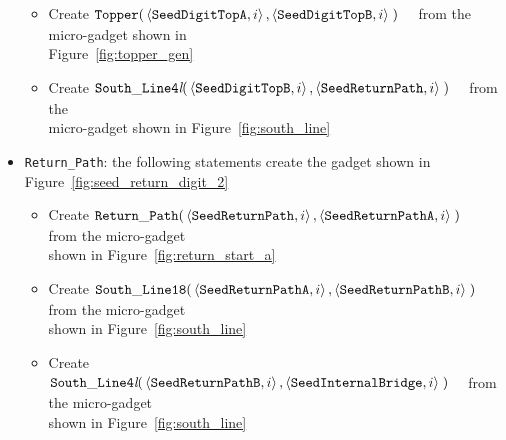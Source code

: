 \begin{itemize}
\begin{itemize}
        \item Create
        $\begin{aligned}[t]
            {\tt Topper}(& \left \langle {\tt SeedDigitTopA}, i \right\rangle,
                           \left \langle {\tt SeedDigitTopB}, i \right\rangle \;)
        \end{aligned}$ from the micro-gadget shown in\\ Figure~\ref{fig:topper_gen}

        \item Create
        $\begin{aligned}[t]
            {\tt South\_Line4\textit{l}}(& \left \langle {\tt SeedDigitTopB}, i \right\rangle,
                                           \left \langle {\tt SeedReturnPath},  i \right\rangle \;)
        \end{aligned}$ from the\\micro-gadget shown in Figure~\ref{fig:south_line}
    \end{itemize}


    \item {\tt Return\_Path}: the following statements create the gadget shown in Figure~\ref{fig:seed_return_digit_2}
    \begin{itemize}

        \item Create
        $\begin{aligned}[t]
            {\tt Return\_Path}(&\left\langle {\tt SeedReturnPath},  i \right\rangle,
                                \left\langle {\tt SeedReturnPathA}, i \right\rangle \;)
        \end{aligned}$ from the micro-gadget\\shown in Figure~\ref{fig:return_start_a}

        \item Create
        $\begin{aligned}[t]
            {\tt South\_Line18}(&\left\langle {\tt SeedReturnPathA}, i \right\rangle,
                                 \left\langle {\tt SeedReturnPathB}, i \right\rangle \;)
        \end{aligned}$ from the micro-gadget\\shown in Figure~\ref{fig:south_line}

        \item Create
        $\begin{aligned}[t]
            {\tt South\_Line4\textit{l}}(&\left\langle {\tt SeedReturnPathB}, i \right\rangle,
                                          \left\langle {\tt SeedInternalBridge},  i \right\rangle \;)
        \end{aligned}$ from the micro-gadget\\shown in Figure~\ref{fig:south_line}
    \end{itemize}


\end{itemize}
